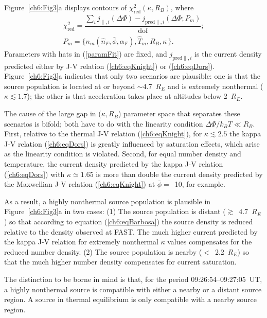   Figure~\ref{ch6:Fig3}a displays contours of $\chi^2_{\textrm{red}} (
  \kappa, R_B )$, where
  \begin{subequations}
    \begin{align} \chi^2_{\mathrm{red}} = \dfrac{\sum_i j_{\parallel,i} (\Delta \Phi) - j_{\textrm{pred}\parallel,i}(\Delta \Phi; P_m)}{\mathrm{dof}}; \\
      P_m = \Big \{ n_m ( \hat{n}_F, \bar{\phi} , \alpha_F ),
      \hat{T}_m, R_B, \kappa \, \Big \}. \label{paramFit}
    \end{align}
  \end{subequations}
  Parameters with hats in (\ref{paramFit}) are fixed, and
  $j_{\textrm{pred}\parallel,i} $ is the current density predicted
  either by J-V relation (\ref{ch6:eqKnight}) or
  (\ref{ch6:eqDors}). Figure~\ref{ch6:Fig3}a indicates that only two
  scenarios are plausible: one is that the source population is
  located at or beyond $\sim$4.7~$R_E$ and is extremely nonthermal
  ($\kappa \lesssim 1.7$); the other is that acceleration takes place
  at altitudes below 2~$R_E$.

  The cause of the large gap in ($\kappa, R_B$) parameter space that
  separates these scenarios is bifold; both have to do with the
  linearity condition $\Delta \Phi / k_B T \ll R_B $. First, relative
  to the thermal J-V relation (\ref{ch6:eqKnight}), for $\kappa
  \lesssim 2.5$ the kappa J-V relation (\ref{ch6:eqDors}) is greatly
  influenced by saturation effects, which arise as the linearity
  condition is violated. Second, for equal number density and
  temperature, the current density predicted by the kappa J-V relation
  (\ref{ch6:eqDors}) with $\kappa \simeq 1.65$ is more than double the
  current density predicted by the Maxwellian J-V relation
  (\ref{ch6:eqKnight}) at $\bar{\phi} =$~10, for example.

  As a result, a highly nonthermal source population is plausible in
  Figure~\ref{ch6:Fig3}a in two cases: (1) The source population is
  distant ($\gtrsim$~4.7~$R_E$) so that according to equation
  (\ref{ch6:eqBarbosa}) the source density is reduced relative to the
  density observed at FAST. The much higher current predicted by the
  kappa J-V relation for extremely nonthermal $\kappa$ values
  compensates for the reduced number density. (2) The source
  population is nearby ($<$~2.2~$R_E$) so that the much higher number
  density compensates for current saturation.

  The distinction to be borne in mind is that, for the period
  09:26:54--09:27:05~UT, a highly nonthermal source is compatible with
  either a nearby or a distant source region. A source in thermal
  equilibrium is only compatible with a nearby source region.

